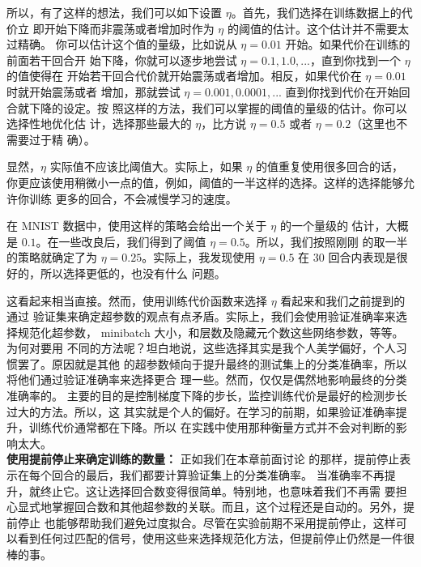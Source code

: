 所以，有了这样的想法，我们可以如下设置 $\eta$。首先，我们选择在训练数据上的代价立
即开始下降而非震荡或者增加时作为 $\eta$ 的阈值的估计。这个估计并不需要太过精确。
你可以估计这个值的量级，比如说从 $\eta=0.01$ 开始。如果代价在训练的前面若干回合开
始下降，你就可以逐步地尝试 $\eta=0.1, 1.0,...$，直到你找到一个 $\eta$ 的值使得在
开始若干回合代价就开始震荡或者增加。相反，如果代价在 $\eta=0.01$ 时就开始震荡或者
增加，那就尝试 $\eta=0.001, 0.0001,...$ 直到你找到代价在开始回合就下降的设定。按
照这样的方法，我们可以掌握\learningrate{}的阈值的量级的估计。你可以选择性地优化估
计，选择那些最大的 $\eta$，比方说 $\eta=0.5$ 或者 $\eta=0.2$（这里也不需要过于精
确）。

显然，$\eta$ 实际值不应该比阈值大。实际上，如果 $\eta$ 的值重复使用很多回合的话，
你更应该使用稍微小一点的值，例如，阈值的一半这样的选择。这样的选择能够允许你训练
更多的回合，不会减慢学习的速度。

在 MNIST 数据中，使用这样的策略会给出一个关于\learningrate{} $\eta$ 的一个量级的
估计，大概是 $0.1$。在一些改良后，我们得到了阈值 $\eta=0.5$。所以，我们按照刚刚
的取一半的策略就确定了\learningrate{}为 $\eta=0.25$。实际上，我发现使用
$\eta=0.5$ 在 $30$ 回合内表现是很好的，所以选择更低的\learningrate{}，也没有什么
问题。

这看起来相当直接。然而，使用训练代价函数来选择 $\eta$ 看起来和我们之前提到的通过
验证集来确定超参数的观点有点矛盾。实际上，我们会使用验证准确率来选择规范化超参数，
minibatch 大小，和层数及隐藏元个数这些网络参数，等等。为何对\learningrate{}要用
不同的方法呢？坦白地说，这些选择其实是我个人美学偏好，个人习惯罢了。原因就是其他
的超参数倾向于提升最终的测试集上的分类准确率，所以将他们通过验证准确率来选择更合
理一些。然而，\learningrate{}仅仅是偶然地影响最终的分类准确率的。\learningrate{}%
主要的目的是控制梯度下降的步长，监控训练代价是最好的检测步长过大的方法。所以，这
其实就是个人的偏好。在学习的前期，如果验证准确率提升，训练代价通常都在下降。所以
在实践中使用那种衡量方式并不会对判断的影响太大。\\

\textbf{使用提前停止\label{early_stopping}来确定训练的\epochs{}数量：} 正如我们在本章前面讨论
的那样，提前停止表示在每个回合的最后，我们都要计算验证集上的分类准确率。
当准确率不再提升，就终止它。这让选择回合数变得很简单。特别地，也意味着我们不再需
要担心显式地掌握回合数和其他超参数的关联。而且，这个过程还是自动的。另外，提前停止
也能够帮助我们避免过度拟合。尽管在实验前期不采用提前停止，这样可
以看到任何过匹配的信号，使用这些来选择规范化方法，但提前停止仍然是一件很
棒的事。

